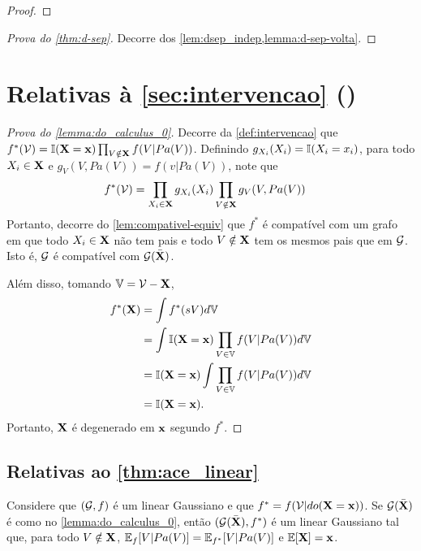 \begin{proof}
\end{proof}

\begin{proof}[Prova do \cref{thm:d-sep}]
 Decorre dos 
 \cref{lem:dsep_indep,lemma:d-sep-volta}.
\end{proof}

\section{Relativas à \cref{sec:intervencao} ()}

\begin{proof}[Prova do \cref{lemma:do_calculus_0}]
 Decorre da \cref{def:intervencao} que
 $f^*({\mathcal V}) = {\mathbb I}({\mathbf{X}}={\mathbf{x}}) \prod_{V \notin {\mathbf{X}}}f(V|Pa(V))$.
 Definindo $g_{X_i}(X_i) = {\mathbb I}(X_i=x_i)$, para todo $X_i \in {\mathbf{X}}$ e
 $g_V(V,Pa(V)) = f(v|Pa(V))$, note que
 \begin{align*}
  f^*({\mathcal V})
  &= \prod_{X_i \in {\mathbf{X}}}g_{X_i}(X_i)
  \prod_{V \notin {\mathbf{X}}}g_V(V,Pa(V)) 
 \end{align*}
 Portanto, decorre do \cref{lem:compativel-equiv} que
 $f^*$ é compatível com um grafo em que
 todo $X_i \in {\mathbf{X}}$ não tem pais e
 todo $V \notin {\mathbf{X}}$ tem os mesmos pais que em ${\mathcal G}$.
 Isto é, ${\mathcal G}$ é compatível com ${\mathcal G}(\bar{{\mathbf{X}}})$.
 
 Além disso, tomando ${\mathbb V} = {\mathcal V} - {\mathbf{X}}$,
 \begin{align*}
  f^*({\mathbf{X}})
  &= \int f^*(sV) d{\mathbb V} \\
  &= \int {\mathbb I}({\mathbf{X}}={\mathbf{x}}) \prod_{V \in {\mathbb V}}f(V|Pa(V)) d{\mathbb V} \\
  &= {\mathbb I}({\mathbf{X}}={\mathbf{x}}) \int \prod_{V \in {\mathbb V}}f(V|Pa(V)) d{\mathbb V} \\
  &= {\mathbb I}({\mathbf{X}}={\mathbf{x}}).
 \end{align*}
 Portanto, ${\mathbf{X}}$ é degenerado em ${\mathbf{x}}$ segundo $f^*$.
\end{proof}

\subsection{Relativas ao \cref{thm:ace_linear}}

\begin{lemma}
 \label{lemma:linear_do}
 Considere que $({\mathcal G},f)$ é 
 um \CM linear Gaussiano e que
 $f^* = f({\mathcal V}|do({\mathbf{X}}={\mathbf{x}}))$.
 Se ${\mathcal G}(\bar{{\mathbf{X}}})$ é 
 como no \cref{lemma:do_calculus_0}, então
 $({\mathcal G}(\bar{{\mathbf{X}}}),f^*)$ é
 um \CM linear Gaussiano tal que,
 para todo $V \notin {\mathbf{X}}$,
 ${\mathbb E}_f[V|Pa(V)] = {\mathbb E}_{f^{*}}[V|Pa(V)]$ e
 ${\mathbb E}[{\mathbf{X}}] = {\mathbf{x}}$.
\end{lemma}

